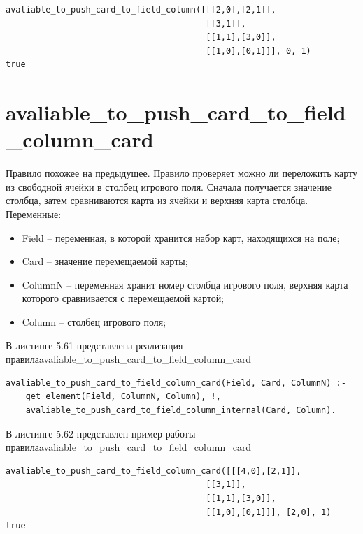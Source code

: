 \documentclass[12pt]{report}
\begin{document}
\begin{lstlisting}[label=some-code, caption=пример работы правила avaliable\_to\_push\_card\_to\_field\_column]
avaliable_to_push_card_to_field_column([[[2,0],[2,1]],
                                        [[3,1]],
                                        [[1,1],[3,0]],
                                        [[1,0],[0,1]]], 0, 1)
true
\end{lstlisting}

\section{avaliable\_to\_push\_card\_to\_field\_column\_card}
Правило похожее на предыдущее. Правило проверяет можно ли переложить карту из свободной ячейки в столбец игрового поля. Сначала получается значение столбца, затем сравниваются карта из ячейки и верхняя карта столбца.
Переменные:
\begin{itemize}
\item Field – переменная, в которой хранится набор карт, находящихся на поле;
\item Card – значение перемещаемой карты;
\item ColumnN – переменная хранит номер столбца игрового поля, верхняя карта которого сравнивается с перемещаемой картой;
\item Column – столбец игрового поля;
\end{itemize}

В листинге 5.61 представлена реализация правила\newline avaliable\_to\_push\_card\_to\_field\_column\_card

\begin{lstlisting}[label=some-code, caption=реализация правила avaliable\_to\_push\_card\_to\_field\_column\_card]
avaliable_to_push_card_to_field_column_card(Field, Card, ColumnN) :-
	get_element(Field, ColumnN, Column), !,
	avaliable_to_push_card_to_field_column_internal(Card, Column).
\end{lstlisting}
В листинге 5.62 представлен пример работы правила\newline avaliable\_to\_push\_card\_to\_field\_column\_card

\begin{lstlisting}[label=some-code, caption=пример работы правила \newline avaliable\_to\_push\_card\_to\_field\_column\_card]
avaliable_to_push_card_to_field_column_card([[[4,0],[2,1]],
                                        [[3,1]],
                                        [[1,1],[3,0]],
                                        [[1,0],[0,1]]], [2,0], 1)
true
\end{lstlisting}
\end{document}
